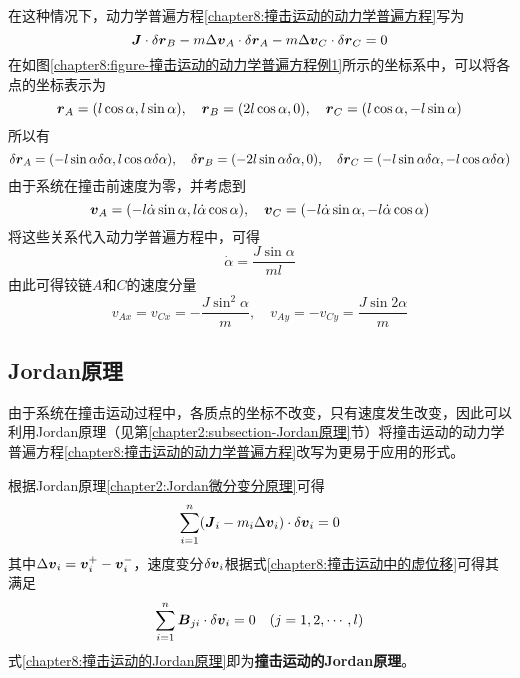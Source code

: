 \begin{solution}
在这种情况下，动力学普遍方程\eqref{chapter8:撞击运动的动力学普遍方程}写为
\begin{equation*}
	\boldsymbol{J}\cdot \delta\boldsymbol{r}_B - m\Delta\boldsymbol{v}_A\cdot \delta\boldsymbol{r}_A - m\Delta\boldsymbol{v}_C\cdot \delta\boldsymbol{r}_C = 0
\end{equation*}
在如图\ref{chapter8:figure-撞击运动的动力学普遍方程例1}所示的坐标系中，可以将各点的坐标表示为
\begin{equation*}
	\boldsymbol{r}_A = (l\cos\alpha,l\sin\alpha),\quad \boldsymbol{r}_B = (2l\cos\alpha,0),\quad \boldsymbol{r}_C = (l\cos\alpha,-l\sin\alpha)
\end{equation*}
所以有
\begin{equation*}
	\delta\boldsymbol{r}_A = (-l\sin\alpha\delta\alpha,l\cos\alpha\delta\alpha),\quad \delta\boldsymbol{r}_B = (-2l\sin\alpha\delta\alpha,0),\quad \delta\boldsymbol{r}_C = (-l\sin\alpha\delta\alpha,-l\cos\alpha\delta\alpha)
\end{equation*}
由于系统在撞击前速度为零，并考虑到
\begin{equation*}
	\boldsymbol{v}_A = (-l\dot{\alpha}\sin\alpha,l\dot{\alpha}\cos\alpha),\quad \boldsymbol{v}_C = (-l\dot{\alpha}\sin\alpha,-l\dot{\alpha}\cos\alpha)
\end{equation*}
将这些关系代入动力学普遍方程中，可得
\begin{equation*}
	\dot{\alpha} = \frac{J\sin\alpha}{ml}
\end{equation*}
由此可得铰链$A$和$C$的速度分量
\begin{equation*}
	v_{Ax} = v_{Cx} = -\frac{J\sin^2\alpha}{m},\quad v_{Ay} = -v_{Cy} = \frac{J\sin2\alpha}{m}
\end{equation*}
\end{solution}

\subsection{Jordan原理}

由于系统在撞击运动过程中，各质点的坐标不改变，只有速度发生改变，因此可以利用Jordan原理（见第\ref{chapter2:subsection-Jordan原理}节）将撞击运动的动力学普遍方程\eqref{chapter8:撞击运动的动力学普遍方程}改写为更易于应用的形式。

根据Jordan原理\eqref{chapter2:Jordan微分变分原理}可得
\begin{equation}
	\sum_{i=1}^n (\boldsymbol{J}_i-m_i\Delta\boldsymbol{v}_i) \cdot \delta\boldsymbol{v}_i = 0
	\label{chapter8:撞击运动的Jordan原理}
\end{equation}
其中$\Delta\boldsymbol{v}_i = \boldsymbol{v}_i^+-\boldsymbol{v}_i^-$，速度变分$\delta\boldsymbol{v}_i$根据式\eqref{chapter8:撞击运动中的虚位移}可得其满足
\begin{equation}
	\sum_{i=1}^n \boldsymbol{B}_{ji}\cdot \delta\boldsymbol{v}_i = 0\quad (j=1,2,\cdots,l)
	\label{chapter8:速度变分满足的关系式}
\end{equation}
式\eqref{chapter8:撞击运动的Jordan原理}即为{\bf 撞击运动的Jordan原理}。

